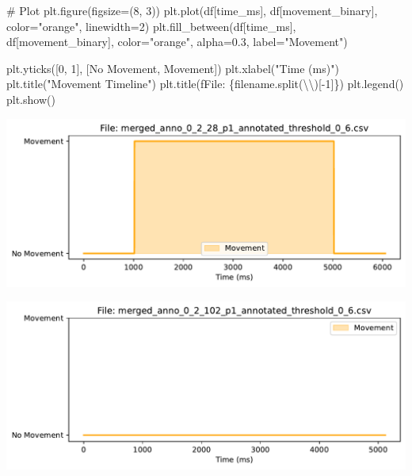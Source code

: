 \documentclass[
  letterpaper,
  DIV=11,
  numbers=noendperiod]{scrreprt}
\newenvironment{Shaded}{\begin{snugshade}}{\end{snugshade}}
\newcommand{\CharTok}[1]{\textcolor[rgb]{0.13,0.47,0.30}{#1}}
\newcommand{\CommentTok}[1]{\textcolor[rgb]{0.37,0.37,0.37}{#1}}
\newcommand{\DecValTok}[1]{\textcolor[rgb]{0.68,0.00,0.00}{#1}}
\newcommand{\FloatTok}[1]{\textcolor[rgb]{0.68,0.00,0.00}{#1}}
\newcommand{\NormalTok}[1]{\textcolor[rgb]{0.00,0.23,0.31}{#1}}
\newcommand{\OperatorTok}[1]{\textcolor[rgb]{0.37,0.37,0.37}{#1}}
\newcommand{\SpecialCharTok}[1]{\textcolor[rgb]{0.37,0.37,0.37}{#1}}
\newcommand{\SpecialStringTok}[1]{\textcolor[rgb]{0.13,0.47,0.30}{#1}}
\newcommand{\StringTok}[1]{\textcolor[rgb]{0.13,0.47,0.30}{#1}}
\begin{document}
\begin{Shaded}
\begin{Highlighting}[]
    \CommentTok{\# Plot}
\NormalTok{    plt.figure(figsize}\OperatorTok{=}\NormalTok{(}\DecValTok{8}\NormalTok{, }\DecValTok{3}\NormalTok{))}
\NormalTok{    plt.plot(df[}\StringTok{\textquotesingle{}time\_ms\textquotesingle{}}\NormalTok{], df[}\StringTok{\textquotesingle{}movement\_binary\textquotesingle{}}\NormalTok{], color}\OperatorTok{=}\StringTok{"orange"}\NormalTok{, linewidth}\OperatorTok{=}\DecValTok{2}\NormalTok{)}
\NormalTok{    plt.fill\_between(df[}\StringTok{\textquotesingle{}time\_ms\textquotesingle{}}\NormalTok{], df[}\StringTok{\textquotesingle{}movement\_binary\textquotesingle{}}\NormalTok{], color}\OperatorTok{=}\StringTok{"orange"}\NormalTok{, alpha}\OperatorTok{=}\FloatTok{0.3}\NormalTok{, label}\OperatorTok{=}\StringTok{"Movement"}\NormalTok{)}
    
\NormalTok{    plt.yticks([}\DecValTok{0}\NormalTok{, }\DecValTok{1}\NormalTok{], [}\StringTok{\textquotesingle{}No Movement\textquotesingle{}}\NormalTok{, }\StringTok{\textquotesingle{}Movement\textquotesingle{}}\NormalTok{])}
\NormalTok{    plt.xlabel(}\StringTok{"Time (ms)"}\NormalTok{)}
\NormalTok{    plt.title(}\StringTok{"Movement Timeline"}\NormalTok{)}
\NormalTok{    plt.title(}\SpecialStringTok{f\textquotesingle{}File: }\SpecialCharTok{\{}\NormalTok{filename}\SpecialCharTok{.}\NormalTok{split(}\StringTok{\textquotesingle{}}\CharTok{\textbackslash{}\textbackslash{}}\StringTok{\textquotesingle{}}\NormalTok{)[}\OperatorTok{{-}}\DecValTok{1}\NormalTok{]}\SpecialCharTok{\}}\SpecialStringTok{\textquotesingle{}}\NormalTok{)}
\NormalTok{    plt.legend()}
\NormalTok{    plt.show()}
\end{Highlighting}
\end{Shaded}

\includegraphics{04_TS_movementAnnotation/02_MovementClassifier_final_files/figure-pdf/cell-15-output-1.pdf}

\includegraphics{04_TS_movementAnnotation/02_MovementClassifier_final_files/figure-pdf/cell-15-output-2.pdf}
\end{document}
